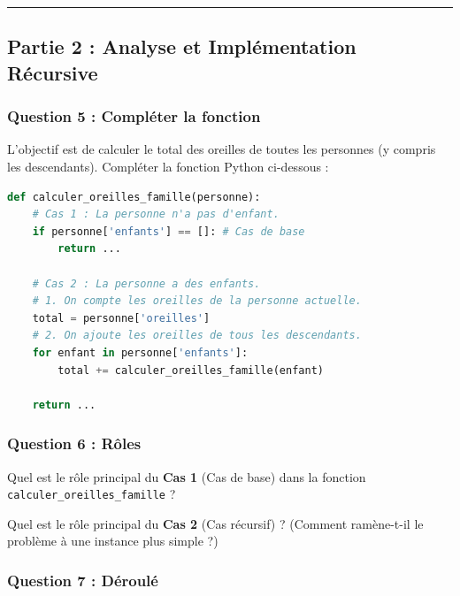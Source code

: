 \newpage

\hrule

\subsection*{Partie 2 : Analyse et Implémentation Récursive}

\begin{Exercise}[title={Fonction Récursive}]

\subsubsection*{Question 5 : Compléter la fonction}

L'objectif est de calculer le total des oreilles de toutes les personnes (y compris les descendants). Compléter la fonction Python ci-dessous :

\begin{lstlisting}[language=Python]
def calculer_oreilles_famille(personne):
    # Cas 1 : La personne n'a pas d'enfant.
    if personne['enfants'] == []: # Cas de base
        return ...
    
    # Cas 2 : La personne a des enfants.
    # 1. On compte les oreilles de la personne actuelle.
    total = personne['oreilles']
    # 2. On ajoute les oreilles de tous les descendants.
    for enfant in personne['enfants']:
        total += calculer_oreilles_famille(enfant)
        
    return ...
\end{lstlisting}

\subsubsection*{Question 6 : Rôles}

\Question Quel est le rôle principal du \textbf{Cas 1} (Cas de base) dans la fonction \texttt{calculer\_oreilles\_famille} ?\\

\emptybox{1cm}

\Question Quel est le rôle principal du \textbf{Cas 2} (Cas récursif) ? (Comment ramène-t-il le problème à une instance plus simple ?)\\

\emptybox{1cm}

\subsubsection*{Question 7 : Déroulé}


\end{Exercise}
